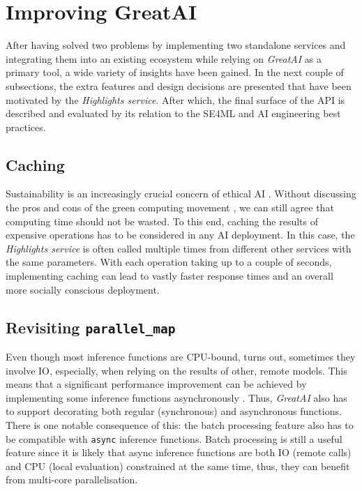 \section{Improving GreatAI}

After having solved two problems by implementing two standalone services and integrating them into an existing ecosystem while relying on \textit{GreatAI} as a primary tool, a wide variety of insights have been gained. In the next couple of subsections, the extra features and design decisions are presented that have been motivated by the \textit{Highlights service}. After which, the final surface of the API is described and evaluated by its relation to the SE4ML \cite{serban2020adoption,serban2021practices} and AI engineering \cite{john2020architecting,john2020ai} best practices.

\subsection{Caching}

Sustainability is an increasingly crucial concern of ethical AI \cite{van2021sustainable}. Without discussing the pros and cons of the green computing movement \cite{10.1145/1400181.1400186}, we can still agree that computing time should not be wasted. To this end, caching the results of expensive operations has to be considered in any AI deployment. In this case, the \textit{Highlights service} is often called multiple times from different other services with the same parameters. With each operation taking up to a couple of seconds, implementing caching can lead to vastly faster response times and an overall more socially conscious deployment.

\subsection{Revisiting \texttt{parallel\_map}}

Even though most inference functions are CPU-bound, turns out, sometimes they involve IO, especially, when relying on the results of other, remote models. This means that a significant performance improvement can be achieved by implementing some inference functions asynchronously \cite{tilkov2010node}. Thus, \textit{GreatAI} also has to support decorating both regular (synchronous) and asynchronous functions. There is one notable consequence of this: the batch processing feature also has to be compatible with \texttt{async} inference functions. Batch processing is still a useful feature since it is likely that async inference functions are both IO (remote calls) and CPU (local evaluation) constrained at the same time, thus, they can benefit from multi-core parallelisation. 

